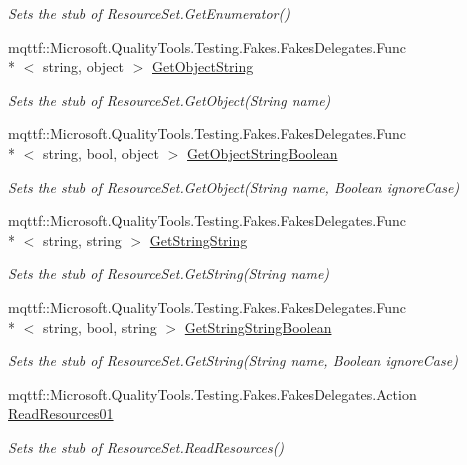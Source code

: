 \begin{DoxyCompactItemize}
\begin{DoxyCompactList}\small\item\em Sets the stub of Resource\-Set.\-Get\-Enumerator()\end{DoxyCompactList}\item 
mqttf\-::\-Microsoft.\-Quality\-Tools.\-Testing.\-Fakes.\-Fakes\-Delegates.\-Func\\*
$<$ string, object $>$ \hyperlink{class_system_1_1_resources_1_1_fakes_1_1_stub_resource_set_a2e407f37deba41a1e4a1e9a6ac3d8846}{Get\-Object\-String}
\begin{DoxyCompactList}\small\item\em Sets the stub of Resource\-Set.\-Get\-Object(\-String name)\end{DoxyCompactList}\item 
mqttf\-::\-Microsoft.\-Quality\-Tools.\-Testing.\-Fakes.\-Fakes\-Delegates.\-Func\\*
$<$ string, bool, object $>$ \hyperlink{class_system_1_1_resources_1_1_fakes_1_1_stub_resource_set_a3ef7a04d12ce0709a3031280583af202}{Get\-Object\-String\-Boolean}
\begin{DoxyCompactList}\small\item\em Sets the stub of Resource\-Set.\-Get\-Object(\-String name, Boolean ignore\-Case)\end{DoxyCompactList}\item 
mqttf\-::\-Microsoft.\-Quality\-Tools.\-Testing.\-Fakes.\-Fakes\-Delegates.\-Func\\*
$<$ string, string $>$ \hyperlink{class_system_1_1_resources_1_1_fakes_1_1_stub_resource_set_ac7cc671eb53c8061df510bdddaed1654}{Get\-String\-String}
\begin{DoxyCompactList}\small\item\em Sets the stub of Resource\-Set.\-Get\-String(\-String name)\end{DoxyCompactList}\item 
mqttf\-::\-Microsoft.\-Quality\-Tools.\-Testing.\-Fakes.\-Fakes\-Delegates.\-Func\\*
$<$ string, bool, string $>$ \hyperlink{class_system_1_1_resources_1_1_fakes_1_1_stub_resource_set_ae7fb5f1263a5b122b536a4a27f4979c3}{Get\-String\-String\-Boolean}
\begin{DoxyCompactList}\small\item\em Sets the stub of Resource\-Set.\-Get\-String(\-String name, Boolean ignore\-Case)\end{DoxyCompactList}\item 
mqttf\-::\-Microsoft.\-Quality\-Tools.\-Testing.\-Fakes.\-Fakes\-Delegates.\-Action \hyperlink{class_system_1_1_resources_1_1_fakes_1_1_stub_resource_set_a1b45548ba3f93a8e286a7384b0ae924c}{Read\-Resources01}
\begin{DoxyCompactList}\small\item\em Sets the stub of Resource\-Set.\-Read\-Resources()\end{DoxyCompactList}\end{DoxyCompactItemize}
